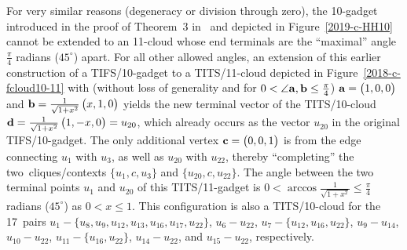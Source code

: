 For very similar reasons (degeneracy or division through zero),
the 10-gadget introduced in the proof of Theorem~3 in~\cite{Ramanathan-18}
and depicted in
Figure~\ref{2019-c-HH10}
cannot be extended to an 11-cloud whose end terminals
are the ``maximal'' angle $\frac{\pi}{4}$ radians ($45^\circ$) apart.
For all other allowed angles, an extension of this earlier construction
of a TIFS/10-gadget to a TITS/11-cloud
depicted in Figure~\ref{2018-c-fcloud10-11}
with (without loss of generality
and for $0< \angle {\bf a},{\bf b} \le \frac{\pi}{4}$)
 ${\bf a} =\begin{pmatrix} 1,0,0 \end{pmatrix}$
and
${\bf b} =\frac{1}{\sqrt{1+x^2}}\begin{pmatrix} x,1,0 \end{pmatrix}$
 yields
the new terminal vector of the TITS/10-cloud
${\bf d} =\frac{1}{\sqrt{1+x^2}}\begin{pmatrix} 1,-x,0 \end{pmatrix} = u_{20}$,
which already occurs as the vector $ u_{20}$
in the original TIFS/10-gadget.
The only additional vertex ${\bf c} =\begin{pmatrix} 0,0,1 \end{pmatrix}$
is from the edge connecting $u_{1}$ with $u_{3}$, as well as $u_{20}$ with $u_{22}$, thereby ``completing'' the two~cliques/contexts $\{u_1,c,u_3\}$ and $\{u_{20},c,u_{22}\}$.
The angle between the two terminal points $u_1$ and $u_{20}$
of this TITS/11-gadget is $0 < \arccos \frac{1}{\sqrt{1+x^2}}\le \frac{\pi}{4}$ radians ($45^\circ$) as $0<x\le 1$.
This configuration is also a
TITS/10-cloud for the 17~pairs
$u_1-\{u_8,u_9,u_{12},u_{13},u_{16},u_{17},u_{22}\}$,
$u_{6}-u_{22}$,
$u_{7}-\{u_{12},u_{16},u_{22}\}$,
$u_{9}-u_{14}$,
$u_{10}-u_{22}$,
$u_{11}-\{ u_{16}, u_{22}\}$,
$u_{14}-u_{22}$, and
$u_{15}-u_{22}$, respectively.
